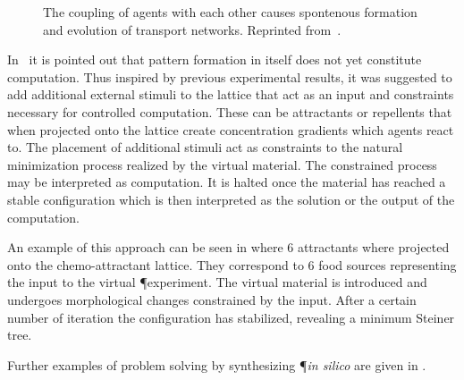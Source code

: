 			\begin{figure}
				\centering
				
				
				\caption[Multi-agent \P \ - Evolution of agents]{The coupling of agents with each other causes spontenous formation and evolution of transport networks. Reprinted from~\cite{jones2016multi}.}
				\label{fig:agent_evolution}
			\end{figure}

			In~\cite{jones2016multi} it is pointed out that pattern formation in itself does not yet constitute computation. Thus inspired by previous experimental results, it was suggested to add additional external stimuli to the lattice that act as an input and constraints necessary for controlled computation. These can be attractants or repellents that when projected onto the lattice create concentration gradients which agents react to. The placement of additional stimuli act as constraints to the natural minimization process realized by the virtual material. The constrained process may be interpreted as computation. It is halted once the material has reached a stable configuration which is then interpreted as the solution or the output of the computation.

			An example of this approach can be seen in  where $6$ attractants where projected onto the chemo-attractant lattice. They correspond to $6$ food sources representing the input to the virtual \P experiment. The virtual material is introduced and undergoes morphological changes constrained by the input. After a certain number of iteration the configuration has stabilized, revealing a minimum Steiner tree.

			Further examples of problem solving by synthesizing \P \textit{in silico} are given in .

